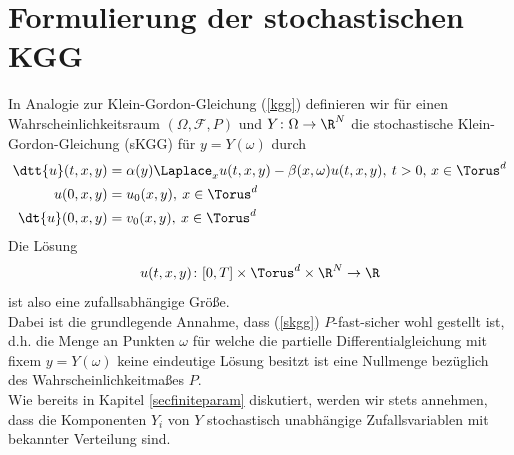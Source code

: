 \section{Formulierung der stochastischen KGG}
In Analogie zur Klein-Gordon-Gleichung (\ref{kgg}) definieren wir für einen Wahrscheinlichkeitsraum $(\Omega,\mathcal{F},P)$ und $Y\colon\Omega\to\R^N$ die stochastische Klein-Gordon-Gleichung (sKGG) für $y=Y(\omega)$ durch
\begin{align}
\label{skgg}
\dtt{u}(t,x,y)&=\alpha(y) \Laplace_x u(t,x,y) - \beta(x,\omega)u(t,x,y), \: t>0, \, x\in \Torus^d\\
u(0,x,y)&=u_0(x,y), \: x\in \Torus^d\\
\dt{u}(0,x,y)&=v_0(x,y), \: x\in \Torus^d
\end{align}
Die Lösung \[u(t,x,y)\colon [0,T]\times\Torus^d\times \R^N\to\R\] ist also eine zufallsabhängige Größe.\\
Dabei ist die grundlegende Annahme, dass (\ref{skgg}) $P$-fast-sicher wohl gestellt ist, d.h. die Menge an Punkten $\omega$ für welche die partielle Differentialgleichung mit fixem $y=Y(\omega)$ keine eindeutige Lösung besitzt ist eine Nullmenge bezüglich des Wahrscheinlichkeitmaßes $P$.\\
Wie bereits in Kapitel \ref{secfiniteparam} diskutiert, werden wir stets annehmen, dass die Komponenten $Y_i$ von $Y$ stochastisch unabhängige Zufallsvariablen mit bekannter Verteilung sind.
